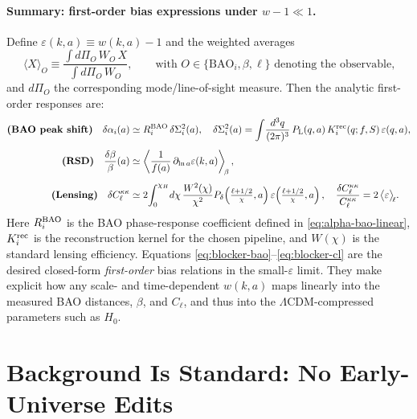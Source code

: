 \documentclass[11pt]{article}
\begin{document}
\paragraph{Summary: first-order bias expressions under $w-1\ll1$.}
Define $\varepsilon(k,a)\equiv w(k,a)-1$ and the weighted averages
\begin{equation}
\big\langle X\big\rangle_{O}\equiv
\frac{\displaystyle \int d\Pi_O\,W_O\,X}{\displaystyle \int d\Pi_O\,W_O},
\qquad \text{with $O\in\{\mathrm{BAO}_i,\beta,\ell\}$ denoting the observable,}
\end{equation}
and $d\Pi_O$ the corresponding mode/line-of-sight measure. Then the analytic first-order responses are:
\begin{align}
\textbf{(BAO peak shift)}\quad
\delta\alpha_i(a)
&\simeq R^{\rm BAO}_i\,\delta\Sigma_i^2(a),
\quad
\delta\Sigma_{i}^2(a)
=\int\!\frac{d^3q}{(2\pi)^3}\,P_{\rm L}(q,a)\,K^{\rm rec}_{i}(q;f,S)\,\varepsilon(q,a),
\label{eq:blocker-bao}\\[4pt]
\textbf{(RSD)}\quad
\frac{\delta\beta}{\beta}(a)
&\simeq \left\langle\frac{1}{f(a)}\,\partial_{\ln a}\varepsilon(k,a)\right\rangle_{\!\beta},
\label{eq:blocker-beta}\\[4pt]
\textbf{(Lensing)}\quad
\delta C_{\ell}^{\kappa\kappa}
&\simeq 2\!\int_0^{\chi_H}\!d\chi\,\frac{W^2(\chi)}{\chi^2}
P_{\delta}\!\left(\tfrac{\ell+1/2}{\chi},a\right)
\varepsilon\!\left(\tfrac{\ell+1/2}{\chi},a\right),
\quad
\frac{\delta C_{\ell}^{\kappa\kappa}}{C_{\ell}^{\kappa\kappa}}
= 2\,\big\langle\varepsilon\big\rangle_{\!\ell}.
\label{eq:blocker-cl}
\end{align}
Here $R^{\rm BAO}_i$ is the BAO phase-response coefficient defined in \eqref{eq:alpha-bao-linear}, $K^{\rm rec}_i$ is the reconstruction kernel for the chosen pipeline, and $W(\chi)$ is the standard lensing efficiency. Equations \eqref{eq:blocker-bao}--\eqref{eq:blocker-cl} are the desired closed-form \emph{first-order} bias relations in the small-$\varepsilon$ limit. They make explicit how any scale- and time-dependent $w(k,a)$ maps linearly into the measured BAO distances, $\beta$, and $C_{\ell}$, and thus into the $\Lambda$CDM-compressed parameters such as $H_0$.

\section{Background Is Standard: No Early-Universe Edits}
\end{document}
